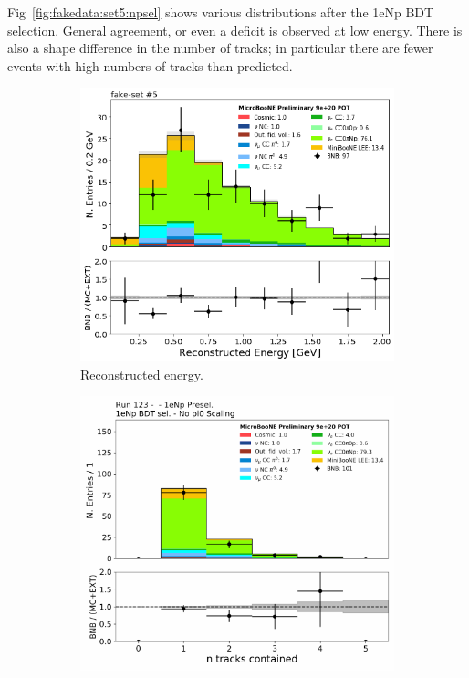 Fig~\ref{fig:fakedata:set5:npsel} shows various distributions after the 1eNp BDT selection.  General agreement, or even a deficit is observed at low energy. There is also a shape difference in the number of tracks; in particular there are fewer events with high numbers of tracks than predicted. 

\begin{figure}[H] 
\begin{center}
    \begin{subfigure}[b]{0.45\textwidth}
    \centering
    \includegraphics[width=1.00\textwidth]{Fakedata/set5/Np_postsel_recoe.pdf}
    \caption{\label{fig:fakedata:set5:Np_postsel_recoe} Reconstructed energy.}
    \end{subfigure}
    \begin{subfigure}[b]{0.45\textwidth}
    \centering
    \includegraphics[width=1.00\textwidth]{Fakedata/set5/Np_postsel_ntracks.pdf}

\end{subfigure}
\end{center}
\end{figure}
